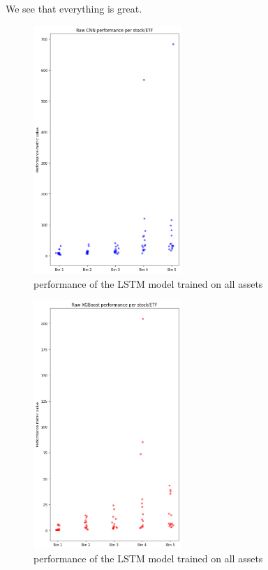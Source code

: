 \documentclass[a4paper,12pt]{report}
\begin{document}
We see that everything is great.
\begin{figure}
  \includegraphics[width=0.5\textwidth]{images/results_CNN.png}
  \caption{performance of the LSTM model trained on all assets}
  \label{fig:wrapped}
\end{figure}







\begin{figure}
  \includegraphics[width=0.5\textwidth]{images/results_XGBoost.png}
  \caption{performance of the LSTM model trained on all assets}
  \label{fig:wrapped}
\end{figure}
\end{document}
